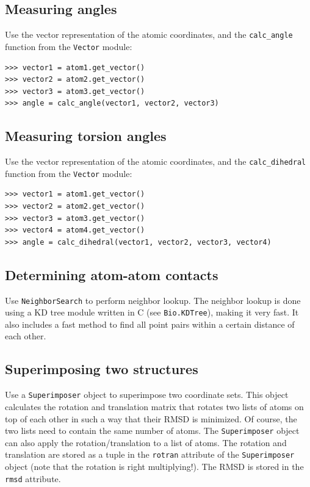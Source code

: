 \documentclass{report}
\begin{document}
\subsection{Measuring angles}
Use the vector representation of the atomic coordinates, and
the \texttt{calc\_angle} function from the \texttt{Vector} module:
\begin{verbatim}
>>> vector1 = atom1.get_vector()
>>> vector2 = atom2.get_vector()
>>> vector3 = atom3.get_vector()
>>> angle = calc_angle(vector1, vector2, vector3)
\end{verbatim}

\subsection{Measuring torsion angles}
Use  the vector representation of the atomic coordinates, and
the \texttt{calc\_dihedral} function from the \texttt{Vector} module:
\begin{verbatim}
>>> vector1 = atom1.get_vector()
>>> vector2 = atom2.get_vector()
>>> vector3 = atom3.get_vector()
>>> vector4 = atom4.get_vector()
>>> angle = calc_dihedral(vector1, vector2, vector3, vector4)
\end{verbatim}

\subsection{Determining atom-atom contacts}

Use \texttt{NeighborSearch} to perform neighbor lookup.
The neighbor lookup is done using a KD tree module written in C (see \texttt{Bio.KDTree}), making it very fast.
It  also includes a fast method to find all point pairs within a certain distance of each other.

\subsection{Superimposing two structures}

Use a \texttt{Superimposer} object to superimpose two coordinate sets.
This object calculates the rotation and translation matrix that rotates
two lists of atoms on top of each other in such a way that their RMSD
is minimized. Of course, the two lists need to contain the same number
of atoms. The \texttt{Superimposer} object can also apply the rotation/translation
to a list of atoms. The rotation and translation are stored as a tuple
in the \texttt{rotran} attribute of the \texttt{Superimposer} object
(note that the rotation is right multiplying!). The RMSD is stored
in the \texttt{rmsd} attribute.
\end{document}
